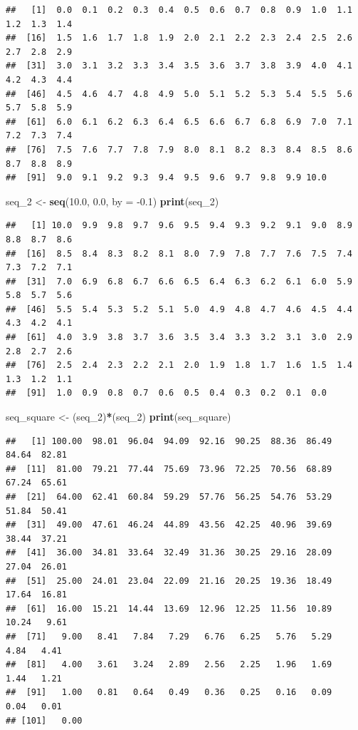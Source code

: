 \documentclass[]{book}
\newenvironment{Shaded}{\begin{snugshade}}{\end{snugshade}}
\newcommand{\DataTypeTok}[1]{\textcolor[rgb]{0.13,0.29,0.53}{#1}}
\newcommand{\DecValTok}[1]{\textcolor[rgb]{0.00,0.00,0.81}{#1}}
\newcommand{\FloatTok}[1]{\textcolor[rgb]{0.00,0.00,0.81}{#1}}
\newcommand{\KeywordTok}[1]{\textcolor[rgb]{0.13,0.29,0.53}{\textbf{#1}}}
\newcommand{\NormalTok}[1]{#1}
\newcommand{\OperatorTok}[1]{\textcolor[rgb]{0.81,0.36,0.00}{\textbf{#1}}}
\newcommand{\StringTok}[1]{\textcolor[rgb]{0.31,0.60,0.02}{#1}}
\begin{document}
\begin{verbatim}
##   [1]  0.0  0.1  0.2  0.3  0.4  0.5  0.6  0.7  0.8  0.9  1.0  1.1  1.2  1.3  1.4
##  [16]  1.5  1.6  1.7  1.8  1.9  2.0  2.1  2.2  2.3  2.4  2.5  2.6  2.7  2.8  2.9
##  [31]  3.0  3.1  3.2  3.3  3.4  3.5  3.6  3.7  3.8  3.9  4.0  4.1  4.2  4.3  4.4
##  [46]  4.5  4.6  4.7  4.8  4.9  5.0  5.1  5.2  5.3  5.4  5.5  5.6  5.7  5.8  5.9
##  [61]  6.0  6.1  6.2  6.3  6.4  6.5  6.6  6.7  6.8  6.9  7.0  7.1  7.2  7.3  7.4
##  [76]  7.5  7.6  7.7  7.8  7.9  8.0  8.1  8.2  8.3  8.4  8.5  8.6  8.7  8.8  8.9
##  [91]  9.0  9.1  9.2  9.3  9.4  9.5  9.6  9.7  9.8  9.9 10.0
\end{verbatim}

\begin{Shaded}
\begin{Highlighting}[]
\NormalTok{seq_}\DecValTok{2}\NormalTok{ <-}\StringTok{ }\KeywordTok{seq}\NormalTok{(}\FloatTok{10.0}\NormalTok{, }\FloatTok{0.0}\NormalTok{, }\DataTypeTok{by =} \FloatTok{-0.1}\NormalTok{)}
\KeywordTok{print}\NormalTok{(seq_}\DecValTok{2}\NormalTok{)}
\end{Highlighting}
\end{Shaded}

\begin{verbatim}
##   [1] 10.0  9.9  9.8  9.7  9.6  9.5  9.4  9.3  9.2  9.1  9.0  8.9  8.8  8.7  8.6
##  [16]  8.5  8.4  8.3  8.2  8.1  8.0  7.9  7.8  7.7  7.6  7.5  7.4  7.3  7.2  7.1
##  [31]  7.0  6.9  6.8  6.7  6.6  6.5  6.4  6.3  6.2  6.1  6.0  5.9  5.8  5.7  5.6
##  [46]  5.5  5.4  5.3  5.2  5.1  5.0  4.9  4.8  4.7  4.6  4.5  4.4  4.3  4.2  4.1
##  [61]  4.0  3.9  3.8  3.7  3.6  3.5  3.4  3.3  3.2  3.1  3.0  2.9  2.8  2.7  2.6
##  [76]  2.5  2.4  2.3  2.2  2.1  2.0  1.9  1.8  1.7  1.6  1.5  1.4  1.3  1.2  1.1
##  [91]  1.0  0.9  0.8  0.7  0.6  0.5  0.4  0.3  0.2  0.1  0.0
\end{verbatim}

\begin{Shaded}
\begin{Highlighting}[]
\NormalTok{seq_square <-}\StringTok{ }\NormalTok{(seq_}\DecValTok{2}\NormalTok{)}\OperatorTok{*}\NormalTok{(seq_}\DecValTok{2}\NormalTok{)}
\KeywordTok{print}\NormalTok{(seq_square)}
\end{Highlighting}
\end{Shaded}

\begin{verbatim}
##   [1] 100.00  98.01  96.04  94.09  92.16  90.25  88.36  86.49  84.64  82.81
##  [11]  81.00  79.21  77.44  75.69  73.96  72.25  70.56  68.89  67.24  65.61
##  [21]  64.00  62.41  60.84  59.29  57.76  56.25  54.76  53.29  51.84  50.41
##  [31]  49.00  47.61  46.24  44.89  43.56  42.25  40.96  39.69  38.44  37.21
##  [41]  36.00  34.81  33.64  32.49  31.36  30.25  29.16  28.09  27.04  26.01
##  [51]  25.00  24.01  23.04  22.09  21.16  20.25  19.36  18.49  17.64  16.81
##  [61]  16.00  15.21  14.44  13.69  12.96  12.25  11.56  10.89  10.24   9.61
##  [71]   9.00   8.41   7.84   7.29   6.76   6.25   5.76   5.29   4.84   4.41
##  [81]   4.00   3.61   3.24   2.89   2.56   2.25   1.96   1.69   1.44   1.21
##  [91]   1.00   0.81   0.64   0.49   0.36   0.25   0.16   0.09   0.04   0.01
## [101]   0.00
\end{verbatim}
\end{document}
